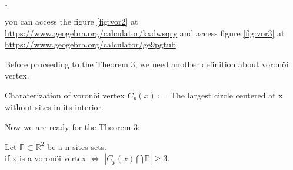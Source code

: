 \documentclass[12pt]{article}
\numberwithin{equation}{section}
\let\bb\mathbb
\newenvironment{coro}[2][]{\begin{box_for_coro}[#1]{#2}}{\end{box_for_coro}}
\newenvironment{proof}{\begin{box_for_proof}}{\end{box_for_proof}}
\newenvironment{general}[2][]{\begin{box_for_gene}[#1]{#2}}{\end{box_for_gene}}
\let\bb\mathbb
\begin{document}
\begin{proof}
\begin{enumerate}
						
					
				\end{enumerate}
			
			\begin{flushright}
				$\square$
			\end{flushright}	
		\end{proof}
		
		you can access the figure \ref{fig:vor2} at \url{https://www.geogebra.org/calculator/kxdwsqry}
		and access figure \ref{fig:vor3} at \url{https://www.geogebra.org/calculator/ge9pgtub}
		
		Before proceeding to the Theorem 3, we need another definition about voronöi vertex.\\
		
		\begin{general}{Charaterization of voronöi vertex}
			$C_p(x) \coloneqq$ The largest circle centered at x without sites in its interior.
		\end{general}
		Now we are ready for the Theorem 3:
		\begin{coro}[title=Theorem 3]{}
			Let $\bb{P} \subset \bb{R}^2$ be a n-sites sets.\\
			if x is a voronöi vertex $\Leftrightarrow$ $|C_p(x) \bigcap \bb{P}| \geq 3$.
		\end{coro}
		
		\vspace{5mm}
		
\end{document}
